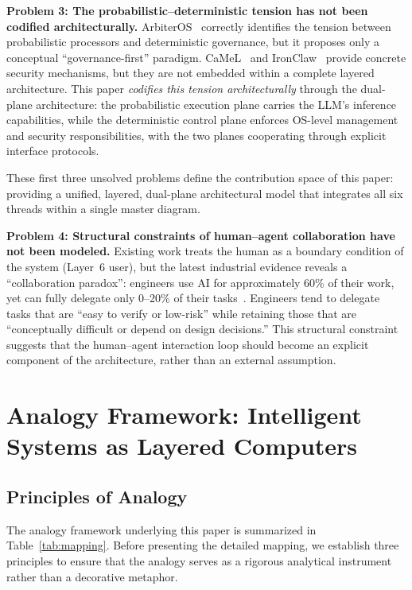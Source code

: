 \documentclass[11pt,a4paper]{article}
\begin{document}
\textbf{Problem 3: The probabilistic--deterministic tension has not been codified architecturally.}
ArbiterOS~\cite{arbiteros2025} correctly identifies the tension between probabilistic processors and deterministic governance, but it proposes only a conceptual ``governance-first'' paradigm.
CaMeL~\cite{debenedetti2025camel} and IronClaw~\cite{ironclaw2025} provide concrete security mechanisms, but they are not embedded within a complete layered architecture.
This paper \textit{codifies this tension architecturally} through the dual-plane architecture: the probabilistic execution plane carries the LLM's inference capabilities, while the deterministic control plane enforces OS-level management and security responsibilities, with the two planes cooperating through explicit interface protocols.

These first three unsolved problems define the contribution space of this paper: providing a unified, layered, dual-plane architectural model that integrates all six threads within a single master diagram.

\textbf{Problem 4: Structural constraints of human--agent collaboration have not been modeled.}
Existing work treats the human as a boundary condition of the system (Layer~6 user), but the latest industrial evidence reveals a ``collaboration paradox'': engineers use AI for approximately 60\% of their work, yet can fully delegate only 0--20\% of their tasks~\cite{anthropic2026agenticreport}.
Engineers tend to delegate tasks that are ``easy to verify or low-risk'' while retaining those that are ``conceptually difficult or depend on design decisions.''
This structural constraint suggests that the human--agent interaction loop should become an explicit component of the architecture, rather than an external assumption.




\section{Analogy Framework: Intelligent Systems as Layered Computers}
\label{sec:framework}

\subsection{Principles of Analogy}

The analogy framework underlying this paper is summarized in Table~\ref{tab:mapping}.
Before presenting the detailed mapping, we establish three principles to ensure that the analogy serves as a rigorous analytical instrument rather than a decorative metaphor.
\end{document}
